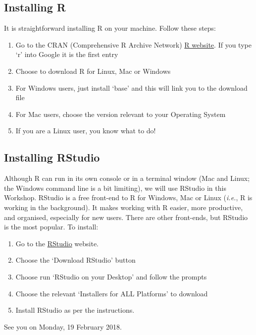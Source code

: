 \documentclass[]{book}
\theoremstyle{definition}
\theoremstyle{definition}
\theoremstyle{definition}
\theoremstyle{remark}
\begin{document}
\subsection{Installing R}\label{installing-r}

It is straightforward installing R on your machine. Follow these steps:

\begin{enumerate}
\def\labelenumi{\arabic{enumi}.}
\item
  Go to the CRAN (Comprehensive R Archive Network)
  \href{http://cran.r-project.org}{R website}. If you type `r' into
  Google it is the first entry
\item
  Choose to download R for Linux, Mac or Windows
\item
  For Windows users, just install `base' and this will link you to the
  download file
\item
  For Mac users, choose the version relevant to your Operating System
\item
  If you are a Linux user, you know what to do!
\end{enumerate}

\subsection{Installing RStudio}\label{installing-rstudio}

Although R can run in its own console or in a terminal window (Mac and
Linux; the Windows command line is a bit limiting), we will use RStudio
in this Workshop. RStudio is a free front-end to R for Windows, Mac or
Linux (\emph{i.e.}, R is working in the background). It makes working
with R easier, more productive, and organised, especially for new users.
There are other front-ends, but RStudio is the most popular. To install:

\begin{enumerate}
\def\labelenumi{\arabic{enumi}.}
\item
  Go to the \href{http://www.rstudio.com}{RStudio} website.
\item
  Choose the `Download RStudio' button
\item
  Choose run `RStudio on your Desktop' and follow the prompts
\item
  Choose the relevant `Installers for ALL Platforms' to download
\item
  Install RStudio as per the instructions.
\end{enumerate}

See you on Monday, 19 February 2018.
\end{document}
